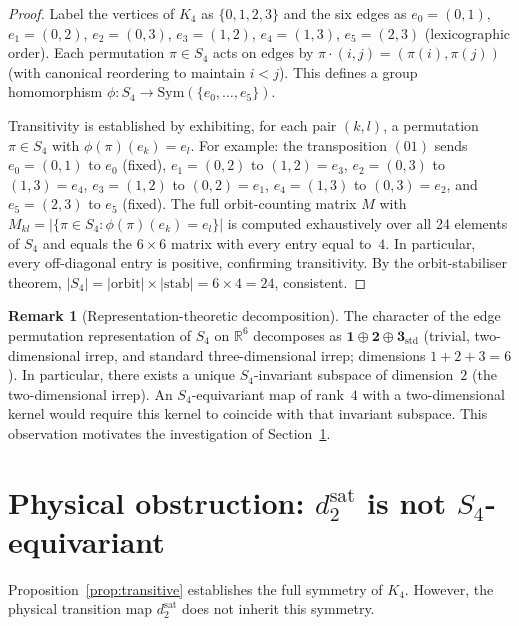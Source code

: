 \documentclass[11pt,a4paper]{article}
\theoremstyle{definition}
\newtheorem{remark}[theorem]{Remark}
\newcommand{\Kfour}{K_4}
\newcommand{\dmap}{d_2}
\begin{document}
\begin{proof}
Label the vertices of $\Kfour$ as $\{0,1,2,3\}$ and the six edges as $e_0 = (0,1)$, $e_1 = (0,2)$, $e_2 = (0,3)$, $e_3 = (1,2)$, $e_4 = (1,3)$, $e_5 = (2,3)$ (lexicographic order). Each permutation $\pi \in S_4$ acts on edges by $\pi\cdot(i,j) = (\pi(i),\pi(j))$ (with canonical reordering to maintain $i < j$). This defines a group homomorphism $\phi: S_4 \to \mathrm{Sym}(\{e_0,\ldots,e_5\})$.

Transitivity is established by exhibiting, for each pair $(k,l)$, a permutation $\pi \in S_4$ with $\phi(\pi)(e_k) = e_l$. For example: the transposition $(01)$ sends $e_0 = (0,1)$ to $e_0$ (fixed), $e_1 = (0,2)$ to $(1,2) = e_3$, $e_2 = (0,3)$ to $(1,3) = e_4$, $e_3 = (1,2)$ to $(0,2) = e_1$, $e_4 = (1,3)$ to $(0,3) = e_2$, and $e_5 = (2,3)$ to $e_5$ (fixed). The full orbit-counting matrix $M$ with $M_{kl} = |\{\pi \in S_4 : \phi(\pi)(e_k) = e_l\}|$ is computed exhaustively over all 24 elements of $S_4$ and equals the $6\times 6$ matrix with every entry equal to~$4$. In particular, every off-diagonal entry is positive, confirming transitivity. By the orbit-stabiliser theorem, $|S_4| = |\mathrm{orbit}|\times|\mathrm{stab}| = 6\times 4 = 24$, consistent.
\end{proof}

\begin{remark}[Representation-theoretic decomposition]
\label{rem:rep}
The character of the edge permutation representation of $S_4$ on $\mathbb{R}^6$ decomposes as $\mathbf{1} \oplus \mathbf{2} \oplus \mathbf{3}_{\mathrm{std}}$ (trivial, two-dimensional irrep, and standard three-dimensional irrep; dimensions $1+2+3=6$). In particular, there exists a unique $S_4$-invariant subspace of dimension~$2$ (the two-dimensional irrep). An $S_4$-equivariant map of rank~$4$ with a two-dimensional kernel would require this kernel to coincide with that invariant subspace. This observation motivates the investigation of Section~\ref{sec:obstruction}.
\end{remark}

\section{Physical obstruction: \texorpdfstring{$\dmap^{\mathrm{sat}}$}{d2sat} is not \texorpdfstring{$S_4$}{S4}-equivariant}
\label{sec:obstruction}

Proposition~\ref{prop:transitive} establishes the full symmetry of $\Kfour$. However, the physical transition map $\dmap^{\mathrm{sat}}$ does not inherit this symmetry.
\end{document}
